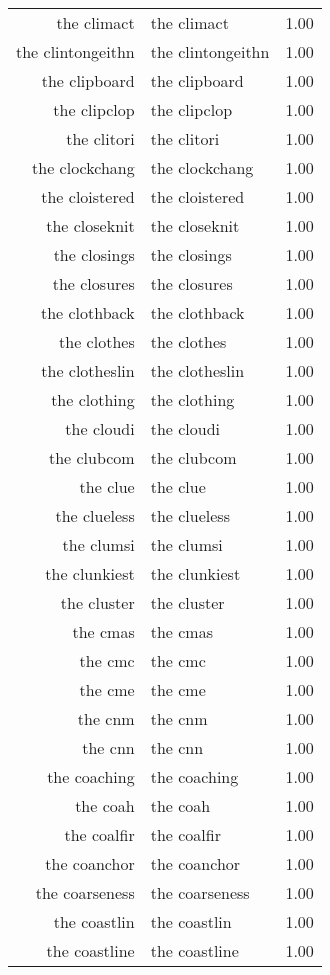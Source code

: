\begin{table}[ht]
\begin{tabular}{rlr}
  the climact & the climact & 1.00 \\ 
  the clintongeithn & the clintongeithn & 1.00 \\ 
  the clipboard & the clipboard & 1.00 \\ 
  the clipclop & the clipclop & 1.00 \\ 
  the clitori & the clitori & 1.00 \\ 
  the clockchang & the clockchang & 1.00 \\ 
  the cloistered & the cloistered & 1.00 \\ 
  the closeknit & the closeknit & 1.00 \\ 
  the closings & the closings & 1.00 \\ 
  the closures & the closures & 1.00 \\ 
  the clothback & the clothback & 1.00 \\ 
  the clothes & the clothes & 1.00 \\ 
  the clotheslin & the clotheslin & 1.00 \\ 
  the clothing & the clothing & 1.00 \\ 
  the cloudi & the cloudi & 1.00 \\ 
  the clubcom & the clubcom & 1.00 \\ 
  the clue & the clue & 1.00 \\ 
  the clueless & the clueless & 1.00 \\ 
  the clumsi & the clumsi & 1.00 \\ 
  the clunkiest & the clunkiest & 1.00 \\ 
  the cluster & the cluster & 1.00 \\ 
  the cmas & the cmas & 1.00 \\ 
  the cmc & the cmc & 1.00 \\ 
  the cme & the cme & 1.00 \\ 
  the cnm & the cnm & 1.00 \\ 
  the cnn & the cnn & 1.00 \\ 
  the coaching & the coaching & 1.00 \\ 
  the coah & the coah & 1.00 \\ 
  the coalfir & the coalfir & 1.00 \\ 
  the coanchor & the coanchor & 1.00 \\ 
  the coarseness & the coarseness & 1.00 \\ 
  the coastlin & the coastlin & 1.00 \\ 
  the coastline & the coastline & 1.00 \\ 

\end{tabular}
\end{table}
